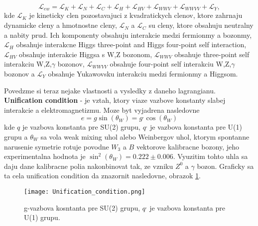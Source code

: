 \documentclass[../../main.tex]{subfiles}
\begin{document}
\begin{equation}
\mathcal{L}_{ew}=\mathcal{L}_{K}+\mathcal{L}_{N}+\mathcal{L}_{C}+\mathcal{L}_{H}+\mathcal{L}_{HV}+\mathcal{L}_{WWV}+\mathcal{L}_{WWVV}+\mathcal{L}_{Y},
\end{equation}
kde $\mathcal{L}_{K}$ je kineticky clen pozostavajuci z  kvadratickych clenov, ktore zahrnaju dynamicke cleny a hmotnostne cleny, $\mathcal{L}_{N}$ a $\mathcal{L}_{C}$ su cleny, ktore obsahuju neutralny a nabity prud. Ich komponenty obsahuju interakcie medzi fermionmy a bozonmy, $\mathcal{L}_{H}$ obsahuje interakcne Higgs three-point and Higgs four-point self interaction, $\mathcal{L}_{HV}$ obsahuje interakcie Higgsa s W,Z bozonom, $\mathcal{L}_{WWV}$
obsahuje three-point self interakciu W,Z,$\gamma$ bozonov, $\mathcal{L}_{WWVV}$ obsahuje four-point self interakciu W,Z,$\gamma$ bozonov a $\mathcal{L}_{Y}$ obsahuje Yukawovsku interakciu medzi fermionmy a Higgsom.\par
Povedzme si teraz nejake vlastnosti a vysledky z daneho 
lagrangianu. \textbf{Unification condition} - je vztah, ktory viaze vazbove konstanty slabej interakcie a elektromagnetizmu. Moze byt vyjadrena nasledovne 
$$
e=g\sin(\theta_W)=g^,\cos(\theta_W)
$$
kde $q$ je vazbova konstanta pre SU(2) grupu, $q^,$ je vazbova konstanta pre U(1) grupu a $\theta_W$ sa vola weak mixing uhol alebo Weinbergov uhol, ktorym spontanne narusenie symetrie rotuje povodne $W_3$ a $B$ vektorove kalibracne bozony, jeho experimentalna hodnota je $\sin^2(\theta_W)=0.222\pm0.006$. Vyuzitim tohto uhla sa daju dane kalibracne polia nakonbinovat tak, ze vzniku $Z^0$ a $\gamma$ bozon. Graficky sa ta cela unification condition da znazornit nasledovne, obrazok \ref{sf1:fig:unifi}.
\begin{figure}[!h]
\centering
\texttt{[image: Unification\_condition.png]}
\caption{g-vazbova kosntanta pre SU(2) grupu, $q^{,}$ je vazbova konstanta pre U(1) grupu.}
\label{sf1:fig:unifi}
\end{figure}
\end{document}
